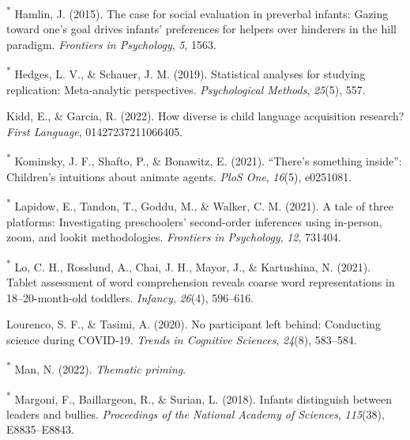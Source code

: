 \documentclass[
  man,floatsintext]{apa6}
\newlength{\cslhangindent}
\newlength{\cslentryspacingunit} %
\newenvironment{CSLReferences}[2] %
 {%
  \setlength{\parindent}{0pt}
  \ifodd #1
  \let\oldpar\par
  \def\par{\hangindent=\cslhangindent\oldpar}
  \fi
  \setlength{\parskip}{#2\cslentryspacingunit}
 }%
 {}
\begin{document}
\begin{CSLReferences}{1}{0}
\leavevmode{}%
\textsuperscript{*} Hamlin, J. (2015). The case for social evaluation in preverbal infants: Gazing toward one's goal drives infants' preferences for helpers over hinderers in the hill paradigm. \emph{Frontiers in Psychology}, \emph{5}, 1563.

\leavevmode{}%
\textsuperscript{*} Hedges, L. V., \& Schauer, J. M. (2019). Statistical analyses for studying replication: Meta-analytic perspectives. \emph{Psychological Methods}, \emph{25}(5), 557.

\leavevmode{}%
Kidd, E., \& Garcia, R. (2022). How diverse is child language acquisition research? \emph{First Language}, 01427237211066405.

\leavevmode{}%
\textsuperscript{*} Kominsky, J. F., Shafto, P., \& Bonawitz, E. (2021). {``There's something inside''}: Children's intuitions about animate agents. \emph{PloS One}, \emph{16}(5), e0251081.

\leavevmode{}%
\textsuperscript{*} Lapidow, E., Tandon, T., Goddu, M., \& Walker, C. M. (2021). A tale of three platforms: Investigating preschoolers' second-order inferences using in-person, zoom, and lookit methodologies. \emph{Frontiers in Psychology}, \emph{12}, 731404.

\leavevmode{}%
\textsuperscript{*} Lo, C. H., Rosslund, A., Chai, J. H., Mayor, J., \& Kartushina, N. (2021). Tablet assessment of word comprehension reveals coarse word representations in 18--20-month-old toddlers. \emph{Infancy}, \emph{26}(4), 596--616.

\leavevmode{}%
Lourenco, S. F., \& Tasimi, A. (2020). No participant left behind: Conducting science during COVID-19. \emph{Trends in Cognitive Sciences}, \emph{24}(8), 583--584.

\leavevmode{}%
\textsuperscript{*} Man, N. (2022). \emph{Thematic priming}.

\leavevmode{}%
\textsuperscript{*} Margoni, F., Baillargeon, R., \& Surian, L. (2018). Infants distinguish between leaders and bullies. \emph{Proceedings of the National Academy of Sciences}, \emph{115}(38), E8835--E8843.


\end{CSLReferences}
\end{document}
